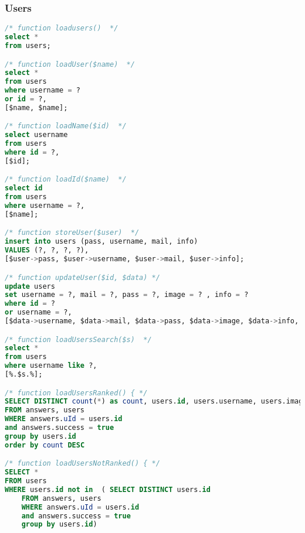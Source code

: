\subsubsection{Users}
\begin{lstlisting}[language=sql]
/* function loadusers()  */
select *
from users;

/* function loadUser($name)  */
select *
from users
where username = ?
or id = ?,
[$name, $name];

/* function loadName($id)  */
select username
from users
where id = ?,
[$id];

/* function loadId($name)  */
select id
from users
where username = ?,
[$name];

/* function storeUser($user)  */
insert into users (pass, username, mail, info)
VALUES (?, ?, ?, ?),
[$user->pass, $user->username, $user->mail, $user->info];

/* function updateUser($id, $data) */
update users
set username = ?, mail = ?, pass = ?, image = ? , info = ?
where id = ?
or username = ?,
[$data->username, $data->mail, $data->pass, $data->image, $data->info, $id, $id];

/* function loadUsersSearch($s)  */
select *
from users
where username like ?,
[%.$s.%];

/* function loadUsersRanked() { */
SELECT DISTINCT count(*) as count, users.id, users.username, users.image
FROM answers, users
WHERE answers.uId = users.id
and answers.success = true
group by users.id
order by count DESC

/* function loadUsersNotRanked() { */
SELECT *
FROM users
WHERE users.id not in  ( SELECT DISTINCT users.id
    FROM answers, users
    WHERE answers.uId = users.id
    and answers.success = true
    group by users.id)
\end{lstlisting}
